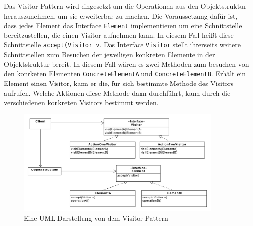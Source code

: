 
Das Visitor Pattern wird eingesetzt um die Operationen aus den Objektstruktur herauszunehmen, um sie erweiterbar zu machen. Die Voraussetzung dafür ist, dass jedes  Element  das Interface \texttt{Element} implementieren um eine Schnittstelle bereitzustellen, die einen Visitor aufnehmen kann. In diesem Fall heißt diese Schnittstelle \texttt{accept(Visitor v}. Das Interface \texttt{Visitor} stellt ihrerseits weitere Schnittstellen zum Besuchen der jeweiligen konkreten Elemente in der Objektstruktur bereit. In diesem Fall wären es zwei Methoden zum besuchen von den konrketen Elementen \texttt{ConcreteElementA} und \texttt{ConcreteElementB}. 
Erhält ein Element einen Visitor, kann er die, für sich bestimmte Methode des Visitors aufrufen. Welche Aktionen diese Methode dann durchführt, kann durch die verschiedenen konkreten Visitors bestimmt werden.

\begin{figure}[htbp]
\centering
\includegraphics[width=0.9\textwidth]{./paper/visitor/visitor}
\caption{Eine UML-Darstellung von dem Visitor-Pattern.}
\label{observerdiagramm}
\end{figure} 
